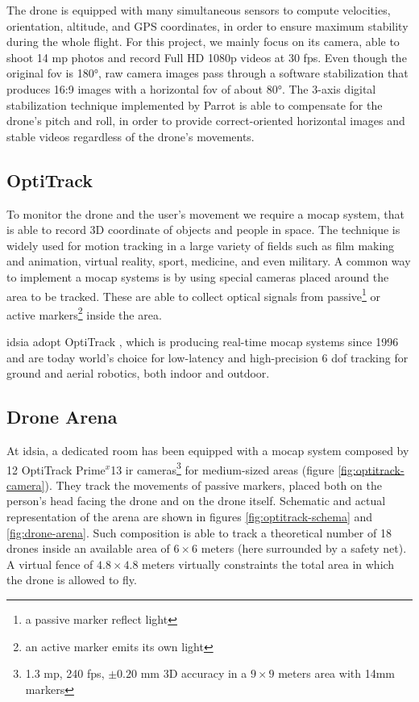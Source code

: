 The drone is equipped with many simultaneous sensors to compute velocities, orientation, altitude, and GPS coordinates, in order to ensure maximum stability during the whole flight. For this project, we mainly focus on its camera, able to shoot 14 \gls{mp} photos and record Full HD 1080p videos at 30 \gls{fps}. Even though the original \gls{fov} is 180°, raw camera images pass through a software stabilization that produces 16:9 images with a horizontal \gls{fov} of about 80°. The 3-axis digital stabilization technique implemented by Parrot is able to compensate for the drone's pitch and roll, in order to provide correct-oriented horizontal images and stable videos regardless of the drone's movements.



\subsection{OptiTrack}
\label{subsec:optitrack}

To monitor the drone and the user's movement we require a \gls{mocap} system, that is able to record 3D coordinate of objects and people in space. The technique is widely used for motion tracking in a large variety of fields such as film making and animation, virtual reality, sport, medicine, and even military. A common way to implement a \gls{mocap} systems is by using special cameras placed around the area to be tracked. These are able to collect optical signals from passive\footnote{a passive marker reflect light} or active markers\footnote{an active marker emits its own light} inside the area.

\medskip

\gls{idsia} adopt OptiTrack \cite{optitrack}, which is producing real-time \gls{mocap} systems since 1996 and are today world’s choice for low-latency and high-precision 6 \gls{dof} tracking for ground and aerial robotics, both indoor and outdoor.



\subsection{Drone Arena}
\label{subsec:drone-arena}

At \gls{idsia}, a dedicated room has been equipped with a \gls{mocap} system composed by 12 OptiTrack Prime$^x$13 \gls{ir} cameras\footnote{1.3 \gls{mp}, 240 \gls{fps}, $\pm0.20$ mm 3D accuracy in a $9 \times 9$ meters area with 14mm markers} for medium-sized areas (figure \ref{fig:optitrack-camera}). They track the movements of passive markers, placed both on the person's head facing the drone and on the drone itself. Schematic and actual representation of the arena are shown in figures \ref{fig:optitrack-schema} and \ref{fig:drone-arena}. Such composition is able to track a theoretical number of 18 drones inside an available area of $6 \times 6$ meters (here surrounded by a safety net). A virtual fence of $4.8 \times 4.8$ meters virtually constraints the total area in which the drone is allowed to fly.

